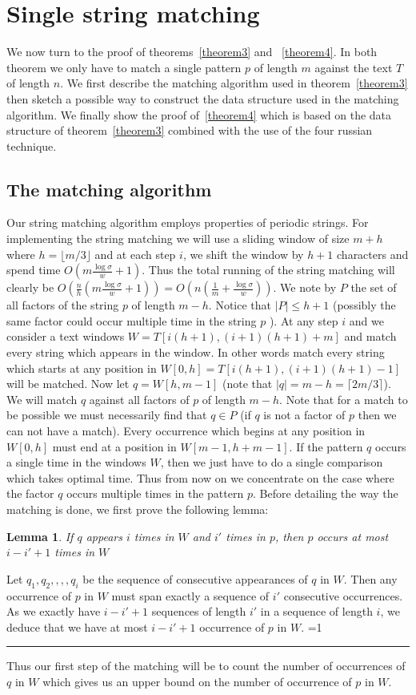 \documentclass{article}
\newcommand{\?}{\mskip1.5mu}
\newcounter{noqed}
\newcommand{\qed}{ \ifmmode\mbox{
}\fi\rule[-.05em]{.3em}{.7em}\setcounter{noqed}{0}}
\newenvironment{proof}[1][{}]{\noindent{\bf Proof#1.
}\setcounter{noqed}{1}}{\ifnum\value{noqed}=1\qed\fi\par\medskip}
\newtheorem{lemma}{Lemma}
\begin{document}
\section{Single string matching}
We now turn to the proof of theorems~\ref{theorem3} and ~\ref{theorem4}. In both theorem we only have to match a single pattern $p$ of length $m$ against the text $T$ of length $n$. We first describe the matching algorithm used in theorem~\ref{theorem3} then sketch a possible way to construct the data structure used in the matching algorithm. We finally show the proof of~\ref{theorem4} which is based on the data structure of theorem~\ref{theorem3} combined with the use of the four russian technique.
\subsection{The matching algorithm}
Our string matching algorithm employs properties of periodic strings. For implementing the string matching we will use a sliding window of size $m+h$ where $h=\lfloor m/3\rfloor$ and at each step $i$, we shift the window by $h+1$ characters and spend time $O(m\frac{\log\sigma}{w}+1)$. Thus the total running of the string matching will clearly be $O(\frac{n}{h}(m\frac{\log\sigma}{w}+1))=O(n(\frac{1}{m}+\frac{\log\sigma}{w}))$. We note by $P$ the set of all factors of the string $p$ of length $m-h$. Notice that $|P|\leq h+1$ (possibly the same factor  could occur multiple time in the string $p$ ). 
At any step $i$ and we consider a text windows $W=T[i(h+1),(i+1)(h+1)+m]$ and match every string which appears in the window. In other words match every string which starts at any position in $W[0,h]=T[i(h+1),(i+1)(h+1)-1]$ will be matched. Now let $q=W[h,m-1]$ (note that $|q|=m-h=\lceil 2m/3\rceil$). We will match $q$ against all factors of $p$ of length $m-h$. Note that for a match to be possible we must necessarily find that $q\in P$ (if $q$ is not a factor of $p$ then we can not have a match). Every occurrence which begins at any position in $W[0,h]$ must end at a position in $W[m-1,h+m-1]$. 
If the pattern $q$ occurs a single time in the windows $W$, then we just have to do a single comparison which takes optimal time. Thus from now on we concentrate on the case where the factor $q$ occurs multiple times in the pattern $p$. Before detailing the way the matching is done, we first prove the following lemma:
\begin{lemma}
\label{lemma:substr_count}
If $q$ appears $i$ times in $W$ and $i'$ times in $p$, then $p$ occurs at most $i-i'+1$ times in $W$
\end{lemma}
\begin{proof}
Let $q_1,q_2,,,,q_i$ be the sequence of consecutive appearances of $q$ in $W$. Then any occurrence of $p$ in $W$ must span exactly a sequence of $i'$ consecutive occurrences. As we exactly have $i-i'+1$ sequences of length $i'$ in a sequence of length $i$, we deduce that we have at most $i-i'+1$ occurrence of $p$ in $W$. 
\end{proof}
Thus our first step of the matching will be to count the number of occurrences of $q$ in $W$ which gives us an upper bound on the number of occurrence of $p$ in $W$. 
\end{document}
